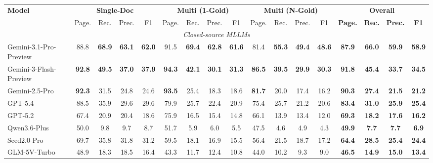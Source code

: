 \documentclass[]{opendatalab}
\newcommand{\highlightgreen}[1]{\colorbox[HTML]{d3ff9f}{\textbf{#1}}}
\newcommand{\highlightblue}[1]{\colorbox[HTML]{bae6fb}{\textbf{#1}}}
\begin{document}
{{{\begin{table}[htbp]
\begin{tabular}{@{}l cccc cccc cccc >{\bfseries}c>{\bfseries}c>{\bfseries}c>{\bfseries}c@{}}
\toprule
\multirow{2.5}{*}{\textbf{Model}} & \multicolumn{4}{c}{\textbf{Single-Doc}} & \multicolumn{4}{c}{\textbf{Multi (1-Gold)}} & \multicolumn{4}{c}{\textbf{Multi (N-Gold)}} & \multicolumn{4}{c}{\textbf{Overall}} \\
\cmidrule(lr){2-5} \cmidrule(lr){6-9} \cmidrule(lr){10-13} \cmidrule(l){14-17}
& Page. & Rec. & Prec. & F1 & Page. & Rec. & Prec. & F1 & Page. & Rec. & Prec. & F1 & Page. & Rec. & Prec. & F1 \\ \midrule
\multicolumn{17}{c}{\textit{Closed-source MLLMs}} \\ \midrule
Gemini-3.1-Pro-Preview &88.8&\highlightblue{68.9}&\highlightblue{63.1}&\highlightblue{62.0}&91.5&\highlightblue{69.4}&\highlightblue{62.8}&\highlightblue{61.6}&81.4&\highlightblue{55.3}&\highlightblue{49.4}&\highlightblue{48.6}&87.9&\highlightblue{66.0}&\highlightblue{59.9}&\highlightblue{58.9} \\

Gemini-3-Flash-Preview &\highlightblue{92.8}&\highlightgreen{49.5}&\highlightgreen{37.0}&\highlightgreen{37.9}&\highlightblue{94.3}&\highlightgreen{42.1}&\highlightgreen{30.1}&\highlightgreen{31.3}&\highlightblue{86.5}&\highlightgreen{39.5}&\highlightgreen{29.9}&\highlightgreen{30.3}&\highlightblue{91.8}&\highlightgreen{45.4}&\highlightgreen{33.7}&\highlightgreen{34.5} \\

Gemini-2.5-Pro &\highlightgreen{92.3}&31.5&24.8&24.6&\highlightgreen{93.5}&25.4&18.3&18.6&\highlightgreen{81.7}&20.0&17.4&16.2&\highlightgreen{90.3}&27.4&21.5&21.2\\

GPT-5.4&88.5&35.9&29.6&29.6&79.9&25.7&22.4&20.9&75.4&25.7&21.2&20.6&83.4&31.0&25.9&25.4\\

GPT-5.2 &67.4&20.9&20.4&18.6&75.9&16.5&15.4&14.8&66.1&13.9&13.4&12.0&69.3&18.2&17.6&16.2\\

Qwen3.6-Plus&50.0&9.8&9.7&8.7&51.7&5.9&6.0&5.5&47.5&4.6&4.9&4.3&49.9&7.7&7.7&6.9\\

Seed2.0-Pro&69.7&35.8&31.8&31.2&59.5&18.1&16.9&15.5&56.4&21.5&18.7&17.2&64.4&28.5&25.4&24.4\\

GLM-5V-Turbo&48.9&18.3&18.5&16.4&43.3&11.7&12.4&10.8&44.0&10.2&9.3&9.0&46.5&14.9&15.0&13.4 \\
\midrule


\end{tabular}
\end{table}}}}
\end{document}
